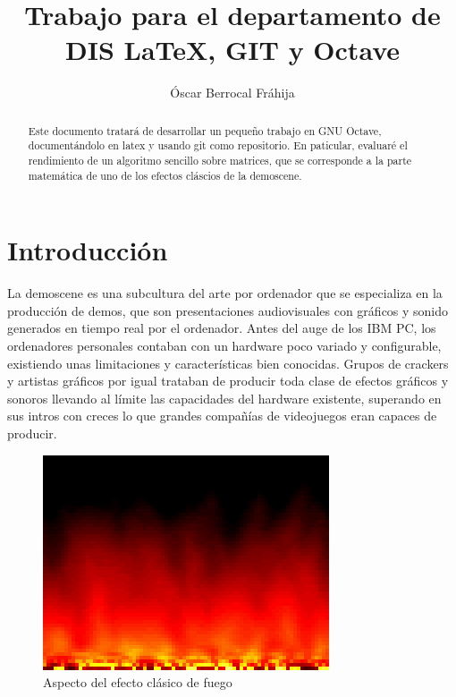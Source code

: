 \documentclass[a4,12pt]{article}
\title{Trabajo para el departamento de DIS \newline
\LaTeX, GIT y Octave}
\author{Óscar Berrocal Fráhija}
\begin{document}
\maketitle



\begin{abstract}
Este documento tratará de desarrollar un pequeño trabajo en GNU Octave, documentándolo en latex y usando git como repositorio. En paticular, evaluaré el rendimiento de un algoritmo sencillo sobre matrices, que se corresponde a la parte matemática de uno de los efectos cláscios de la demoscene.
\end{abstract}
\newpage
\tableofcontents

\listoffigures

\newpage

\section{Introducción}
La demoscene es una subcultura del arte por ordenador que se especializa en la producción de demos, que son presentaciones audiovisuales con gráficos y sonido generados en tiempo real por el ordenador.
\newline
\newline
Antes del auge de los IBM PC, los ordenadores personales contaban con un hardware poco variado y configurable, existiendo unas limitaciones y características bien conocidas. Grupos de crackers y artistas gráficos por igual trataban de producir toda clase de efectos gráficos y sonoros llevando al límite las capacidades del hardware existente, superando en sus intros con creces lo que grandes compañías de videojuegos eran capaces de producir.
\newline
\newline
\begin{figure}[h!]
  \centering
    \includegraphics{img/fire}
  \caption{Aspecto del efecto clásico de fuego}
\end{figure}
\end{document}
